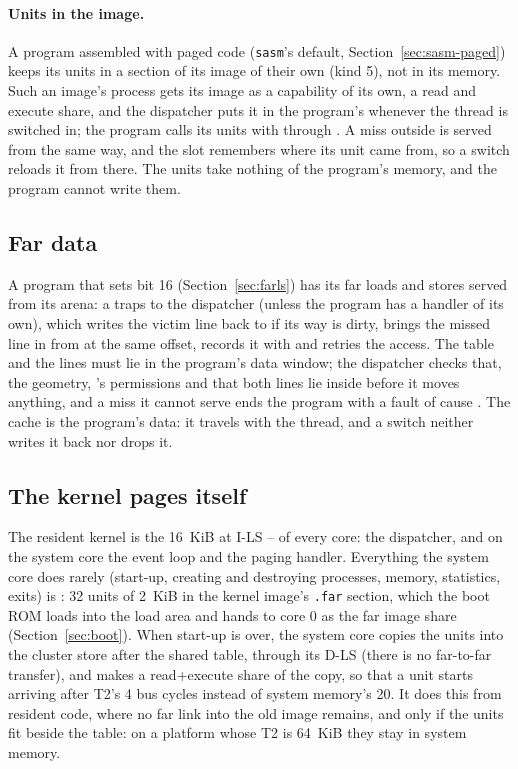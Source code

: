 \paragraph{Units in the image.} A program assembled with paged code (\texttt{sasm}'s default,
Section~\ref{sec:sasm-paged}) keeps its units in a section of its image of their own (kind 5), not in
its memory. Such an image's process gets its image as a capability of its own, a read and execute
share, and the dispatcher puts it in the program's  whenever the thread is switched in; the
program calls its units with  through . A miss outside  is served from
 the same way, and the slot remembers where its unit came from, so a switch reloads it from
there. The units take nothing of the program's memory, and the program cannot write them.

\subsection{Far data}\label{sec:os-fardata}

A program that sets  bit 16 (Section~\ref{sec:farls}) has its far loads and stores served
from its arena: a  traps to the dispatcher (unless the program has a handler of its own),
which writes the victim line back to  if its way is dirty, brings the missed line in from
 at the same offset, records it with  and retries the access. The table and the
lines must lie in the program's data window; the dispatcher checks that, the geometry, 's
permissions and that both lines lie inside  before it moves anything, and a miss it cannot
serve ends the program with a fault of cause . The cache is the program's data: it
travels with the thread, and a switch neither writes it back nor drops it.

\subsection{The kernel pages itself}\label{sec:os-kpaging}

The resident kernel is the 16~KiB at I-LS -- of every core: the dispatcher, and on
the system core the event loop and the paging handler. Everything the system core does rarely
(start-up, creating and destroying processes, memory, statistics, exits) is :
32 units of 2~KiB in the kernel image's \texttt{.far} section, which the boot ROM loads into the load
area and hands to core 0 as the far image share  (Section~\ref{sec:boot}). When start-up is
over, the system core copies the units into the cluster store after the shared table, through its D-LS
(there is no far-to-far transfer), and makes  a read+execute share of the copy, so that a unit
starts arriving after T2's 4 bus cycles instead of system memory's 20. It does this from resident
code, where no far link into the old image remains, and only if the units fit beside the table: on a
platform whose T2 is 64~KiB they stay in system memory.


